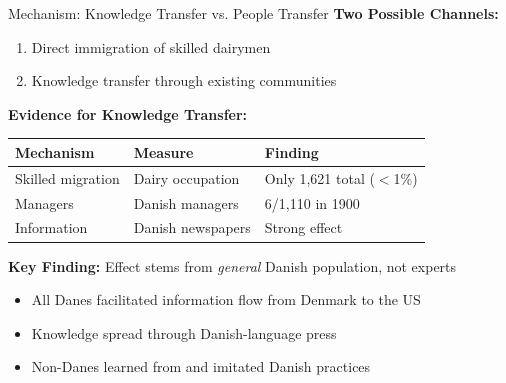 \documentclass{beamer}
\begin{document}
\begin{frame}{Mechanism: Knowledge Transfer vs. People Transfer}
\textbf{Two Possible Channels:}
\begin{enumerate}
    \item Direct immigration of skilled dairymen
    \item Knowledge transfer through existing communities
\end{enumerate}

\vspace{0.3cm}
\textbf{Evidence for Knowledge Transfer:}
\begin{table}[h]
\centering
\small
\begin{tabular}{lll}
\hline
\textbf{Mechanism} & \textbf{Measure} & \textbf{Finding} \\
\hline
Skilled migration & Dairy occupation & Only 1,621 total ($<$1\%) \\
Managers & Danish managers & 6/1,110 in 1900 \\
Information & Danish newspapers & Strong effect \\
\hline
\end{tabular}
\end{table}

\vspace{0.3cm}
\textbf{Key Finding:} Effect stems from \textit{general} Danish population, not experts
\begin{itemize}
    \item All Danes facilitated information flow from Denmark to the US
    \item Knowledge spread through Danish-language press
    \item Non-Danes learned from and imitated Danish practices
\end{itemize}
\end{frame}
\end{document}
